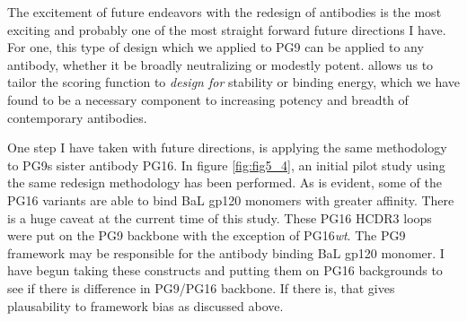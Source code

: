 The excitement of future endeavors with the redesign of antibodies is the most exciting and probably one of the most straight forward future directions I have. For one, this type of design which we applied to PG9 can be applied to any antibody, whether it be broadly neutralizing or modestly potent. \rosetta allows us to tailor the scoring function to \textit{design for} stability or binding energy, which we have found to be a necessary component to increasing potency and breadth of contemporary antibodies.

One step I have taken with future directions, is applying the same methodology to PG9s sister antibody PG16. In figure \ref{fig:fig5_4}, an initial pilot study using the same redesign methodology has been performed. As is evident, some of the PG16 variants are able to bind BaL gp120 monomers with greater affinity. There is a huge caveat at the current time of this study. These PG16 HCDR3 loops were put on the PG9 backbone with the exception of PG16\textit{wt}. The PG9 framework may be responsible for the antibody binding BaL gp120 monomer. I have begun taking these constructs and putting them on PG16 backgrounds to see if there is difference in PG9/PG16 backbone. If there is, that gives plausability to framework bias as discussed above.

